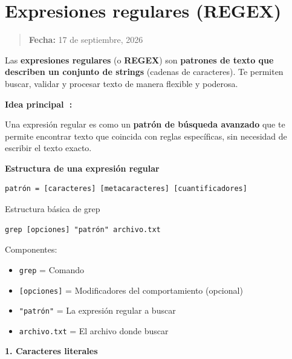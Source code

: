 \documentclass[
  spanish,
  12pt,
  letterpaper,
  DIV=11,
  numbers=noendperiod]{scrreprt}
\providecommand{\tightlist}{%
  \setlength{\itemsep}{0pt}\setlength{\parskip}{0pt}}
\begin{document}
\chapter{Expresiones regulares
(REGEX)}\label{expresiones-regulares-regex}

\begin{quote}
\textbf{Fecha:} 17 de septiembre, 2026
\end{quote}

Las \textbf{expresiones regulares} (o \textbf{REGEX}) son
\textbf{patrones de texto que describen un conjunto de strings} (cadenas
de caracteres). Te permiten buscar, validar y procesar texto de manera
flexible y poderosa.

\begin{tcolorbox}[enhanced jigsaw, arc=.35mm, bottomrule=.15mm, breakable, colback=white, colframe=quarto-callout-tip-color-frame, left=2mm, leftrule=.75mm, opacityback=0, rightrule=.15mm, toprule=.15mm]

\textbf{Idea principal 🎯:}

Una expresión regular es como un \textbf{patrón de búsqueda avanzado}
que te permite encontrar texto que coincida con reglas específicas, sin
necesidad de escribir el texto exacto.

\end{tcolorbox}

\textbf{Estructura de una expresión regular}

\begin{verbatim}
patrón = [caracteres] [metacaracteres] [cuantificadores]
\end{verbatim}

Estructura básica de grep

\begin{verbatim}
grep [opciones] "patrón" archivo.txt
\end{verbatim}

Componentes:

\begin{itemize}
\tightlist
\item
  \texttt{grep} = Comando
\item
  \texttt{{[}opciones{]}} = Modificadores del comportamiento (opcional)
\item
  \texttt{"patrón"} = La expresión regular a buscar
\item
  \texttt{archivo.txt} = El archivo donde buscar
\end{itemize}

\textbf{1. Caracteres literales}
\end{document}
